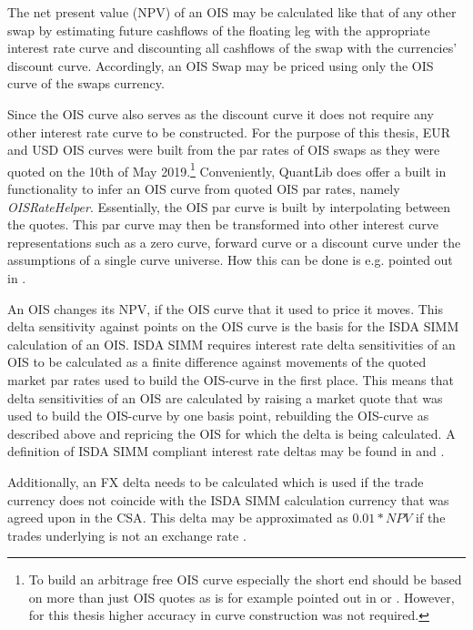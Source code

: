 \documentclass[../Thesis_AHoecherl.tex]{subfiles}
\begin{document}
    The net present value (\gls{NPV}) of an \gls{OIS} may be calculated like that of any other swap by estimating future cashflows of the floating leg with the appropriate interest rate curve and discounting all cashflows of the swap with the currencies' discount curve.
    Accordingly, an \gls{OIS} Swap may be priced using only the \gls{OIS} curve of the swaps currency.

    Since the \gls{OIS} curve also serves as the discount curve it does not require any other interest rate curve to be constructed. 
    For the purpose of this thesis, EUR and USD \gls{OIS} curves were built from the par rates of \gls{OIS} swaps as they were quoted on the 10th of May 2019.\footnote{To build an arbitrage free \gls{OIS} curve especially the short end should be based on more than just \gls{OIS} quotes as is for example pointed out in \cite{ametrano2013everything} or \cite{brugger2018valuation}. However, for this thesis higher accuracy in curve construction was not required.}
    Conveniently, QuantLib does offer a built in functionality to infer an \gls{OIS} curve from quoted \gls{OIS} par rates, namely \emph{OISRateHelper}. Essentially, the \gls{OIS} par curve is built by interpolating between the quotes.
    This par curve may then be transformed into other interest curve representations such as a zero curve, forward curve or a discount curve under the assumptions of a single curve universe. How this can be done is e.g. pointed out in \cite[Chapter 4]{hull2009options}.

    An \gls{OIS} changes its \gls{NPV}, if the \gls{OIS} curve that it used to price it moves.
    This delta sensitivity against points on the \gls{OIS} curve is the basis for the \gls{ISDA SIMM} calculation of an \gls{OIS}.
    \gls{ISDA SIMM} requires interest rate delta sensitivities of an \gls{OIS} to be calculated as a finite difference against movements of the quoted market par rates used to build the \gls{OIS}-curve in the first place. 
    This means that delta sensitivities of an \gls{OIS} are calculated by raising a market quote that was used to build the \gls{OIS}-curve by one basis point, rebuilding the \gls{OIS}-curve as described above and repricing the \gls{OIS} for which the delta is being calculated.
    A definition of \gls{ISDA SIMM} compliant interest rate deltas may be found in \cite[Point 22]{SIMM} and \cite[Section 2.2]{RiskDataStandard}.
    
    Additionally, an FX delta needs to be calculated which is used if the trade currency does not coincide with the \gls{ISDA SIMM} calculation currency that was agreed upon in the \gls{CSA}. This delta may be approximated as $0.01 * NPV$ if the trades underlying is not an exchange rate \cite[Section 2.7]{RiskDataStandard}.
\end{document}
